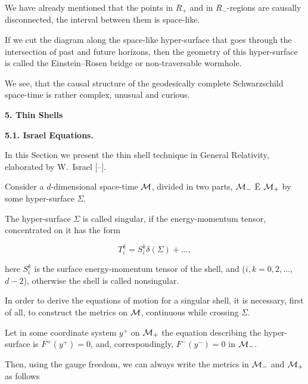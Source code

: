 We have already mentioned that the points in $R_+$ and in $R_-$-regions are causally disconnected, the interval between them is space-like. 

If we cut the diagram along the space-like hyper-surface that goes through the intersection of past and future horizons, then the geometry of this hyper-surface is called the Einstein--Rosen bridge \cite{berez:ER} or non-traversable wormhole. 

We see, that the causal structure of the geodesically complete Schwarzschild space-time is rather complex, unusual and curious.



\bigskip



\textbf{5. Thin Shells}



\smallskip



\textbf{5.1. Israel Equations.}


In this Section we present the thin shell technique in General Relativity, elaborated by W.~Israel [--].



Consider a $d$-dimensional space-time ${\cal M}$, divided in two parts, ${\cal M}_-$ Ë ${\cal M}_+$ by some hyper-surface $\Sigma$. 

The hyper-surface $\Sigma$ is called singular, if the energy-momentum tensor, concentrated on it has the form 

$$

T_i^k=S_i^k\delta(\Sigma) + \dots,

$$

here $S_i^k$ is the surface energy-momentum tensor of the shell, and ($i, k = 0, 2, \dots,$ $ {d-2}$), otherwise the shell is called nonsingular.



In order to derive the equations of motion for a singular shell, it is necessary, first of all, to construct the metrics on ${\cal M}$, continuous while crossing $\Sigma$. 

Let in some coordinate system $y^+$ on ${\cal M}_+$ the equation describing the hyper-surface is $F^+(y^+) = 0$, and, correspondingly, $F^-(y^-) = 0$ in ${\cal M}_-$. 

Then, using the gauge freedom, we can always write the metrics in ${\cal M}_-$ and ${\cal M}_+$ as follows

